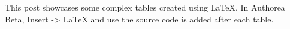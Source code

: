 This post showcases some complex tables created using LaTeX. In Authorea Beta, Insert -> LaTeX and use the source code is added after each table.

\newline